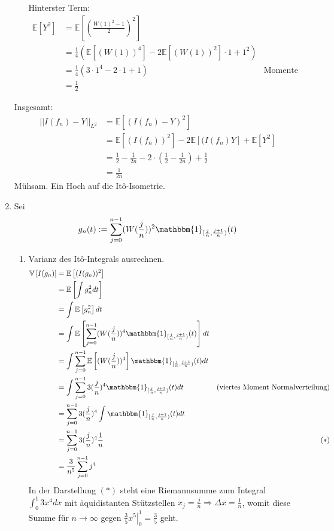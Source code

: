 \documentclass[a4paper,11pt,notitlepage,fullpage]{article}
\newcommand{\Ee}[1]{\mathbb E\left[#1\right]}
\newcommand{\Vv}[1]{\mathbb V\left[#1\right]}
\newcommand{\indd}[1]{\mathbbm{1}_{#1}}
\newcommand{\norm}[2]{\left|\left|{#1}\right|\right|_{#2}}
\begin{document}
\begin{enumerate}
\begin{enumerate}
Hinterster Term:
\begin{align*}
\Ee{Y^2} &= \Ee{\left(\frac{W(1)^2-1}{2}\right)^2}\\
&= \frac{1}{4}\left(\Ee{(W(1))^4} -2\Ee{(W(1))^2}\cdot 1 +1^2\right)\\
&= \frac{1}{4}\left(3\cdot 1^4 -2\cdot 1 +1\right) &\text{Momente}\\
&= \frac{1}{2}
\end{align*}
\end{enumerate}

Insgesamt:
\begin{align*}
\norm{I(f_n)-Y}{L^2} &= \Ee{(I(f_n) - Y)^2}\\
&= \Ee{(I(f_n))^2} -2\Ee{(I(f_n)Y} + \Ee{Y^2}\\
&=\frac{1}{2} - \frac{1}{2n} - 2\cdot\left(\frac{1}{2} - \frac{1}{2n}\right) +\frac{1}{2}\\
&= \frac{1}{2n}
\end{align*}
Mühsam. Ein Hoch auf die Itô-Isometrie.

\newpage
\item Sei
$$g_n(t) := \sum_{j=0}^{n-1} (W(\frac{j}{n}))^2 \indd{[\frac{j}{n}, \frac{j+1}{n})}(t)$$
\begin{enumerate}
\item Varianz des Itô-Integrals ausrechnen.
\begin{align*}
\Vv{I(g_n)} &= \Ee{(I(g_n))^2}\\
&=\Ee{\int g_n^2 dt}\\
&= \int \Ee{g_n^2} dt\\
&= \int \Ee{\sum_{j=0}^{n-1} (W(\frac{j}{n}))^4 \indd{[\frac{j}{n}, \frac{j+1}{n})}(t)} dt\\
&= \int \sum_{j=0}^{n-1} \Ee{(W(\frac{j}{n}))^4} \indd{[\frac{j}{n}, \frac{j+1}{n})}(t) dt\\
&= \int \sum_{j=0}^{n-1} 3(\frac{j}{n})^4 \indd{[\frac{j}{n}, \frac{j+1}{n})}(t) dt &\text{(viertes Moment Normalverteilung)}\\
&= \sum_{j=0}^{n-1} 3(\frac{j}{n})^4 \int \indd{[\frac{j}{n}, \frac{j+1}{n})}(t) dt\\
&= \sum_{j=0}^{n-1} 3(\frac{j}{n})^4 \frac{1}{n} &(*)\\
&= \frac{3}{n^5} \sum_{j=0}^{n-1} j^4 \\
\end{align*}
In der Darstellung $(*)$ steht eine Riemannsumme zum Integral $\int_0^1 3x^4 dx$ mit äquidistanten Stützstellen $x_j = \frac{j}{n} \Rightarrow \Delta x = \frac{1}{n}$, womit diese Summe für $n\rightarrow \infty$ gegen $\left. \frac{3}{5}x^5\right|_0^1 = \frac{3}{5}$ geht.


\end{enumerate}
\end{enumerate}
\end{document}
